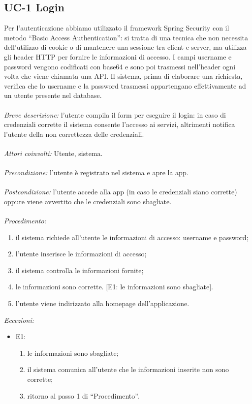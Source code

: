 \subsection{UC-1 Login}
Per l'autenticazione abbiamo utilizzato il framework Spring Security con il metodo ``Basic Access Authentication'': si tratta di una tecnica che non necessita dell'utilizzo di cookie o di mantenere una sessione tra client e server, ma utilizza gli header HTTP per fornire le informazioni di accesso. I campi username e password vengono codificati con base64 e sono poi trasmessi nell'header ogni volta che viene chiamata una API. Il sistema, prima di elaborare una richiesta, verifica che lo username e la password trasmessi appartengano effettivamente ad un utente presente nel database. 
\\
\\
\textit{Breve descrizione:} l'utente compila il form per eseguire il login: in caso di credenziali corrette il sistema consente l'accesso ai servizi, altrimenti notifica l'utente della non correttezza delle credenziali.
\\
\\
\textit{Attori coinvolti:} Utente, sistema.
\\
\\
\textit{Precondizione:} l'utente è registrato nel sistema e apre la app.
\\
\\
\textit{Postcondizione:} l'utente accede alla app (in caso le credenziali siano corrette) oppure viene avvertito che le credenziali sono sbagliate.
\\
\\
\textit{Procedimento:}
\begin{enumerate}
	\item il sistema richiede all'utente le informazioni di accesso: username e password;
	\item l'utente inserisce le informazioni di accesso;
	\item il sistema controlla le informazioni fornite;
	\item le informazioni sono corrette. [E1: le informazioni sono sbagliate].
	\item l'utente viene indirizzato alla homepage dell'applicazione.
\end{enumerate}
\newpage
\textit{Eccezioni:}
\begin{itemize}
	\item E1:
	\begin{enumerate}
		\item le informazioni sono sbagliate;
		\item il sistema comunica all'utente che le informazioni inserite non sono corrette;
		\item ritorno al passo 1 di ``Procedimento''.
	\end{enumerate}
\end{itemize}

